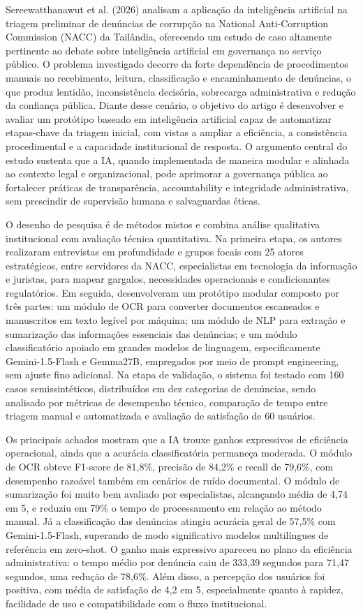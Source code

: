 \documentclass[12pt,a4paper]{article}
\begin{document}
Sereewatthanawut et al. (2026) analisam a aplicação da inteligência artificial na triagem preliminar de denúncias de corrupção na National Anti-Corruption Commission (NACC) da Tailândia, oferecendo um estudo de caso altamente pertinente ao debate sobre inteligência artificial em governança no serviço público. O problema investigado decorre da forte dependência de procedimentos manuais no recebimento, leitura, classificação e encaminhamento de denúncias, o que produz lentidão, inconsistência decisória, sobrecarga administrativa e redução da confiança pública. Diante desse cenário, o objetivo do artigo é desenvolver e avaliar um protótipo baseado em inteligência artificial capaz de automatizar etapas-chave da triagem inicial, com vistas a ampliar a eficiência, a consistência procedimental e a capacidade institucional de resposta. O argumento central do estudo sustenta que a IA, quando implementada de maneira modular e alinhada ao contexto legal e organizacional, pode aprimorar a governança pública ao fortalecer práticas de transparência, accountability e integridade administrativa, sem prescindir de supervisão humana e salvaguardas éticas.

O desenho de pesquisa é de métodos mistos e combina análise qualitativa institucional com avaliação técnica quantitativa. Na primeira etapa, os autores realizaram entrevistas em profundidade e grupos focais com 25 atores estratégicos, entre servidores da NACC, especialistas em tecnologia da informação e juristas, para mapear gargalos, necessidades operacionais e condicionantes regulatórios. Em seguida, desenvolveram um protótipo modular composto por três partes: um módulo de OCR para converter documentos escaneados e manuscritos em texto legível por máquina; um módulo de NLP para extração e sumarização das informações essenciais das denúncias; e um módulo classificatório apoiado em grandes modelos de linguagem, especificamente Gemini-1.5-Flash e Gemma27B, empregados por meio de prompt engineering, sem ajuste fino adicional. Na etapa de validação, o sistema foi testado com 160 casos semissintéticos, distribuídos em dez categorias de denúncias, sendo analisado por métricas de desempenho técnico, comparação de tempo entre triagem manual e automatizada e avaliação de satisfação de 60 usuários.

Os principais achados mostram que a IA trouxe ganhos expressivos de eficiência operacional, ainda que a acurácia classificatória permaneça moderada. O módulo de OCR obteve F1-score de 81,8\%, precisão de 84,2\% e recall de 79,6\%, com desempenho razoável também em cenários de ruído documental. O módulo de sumarização foi muito bem avaliado por especialistas, alcançando média de 4,74 em 5, e reduziu em 79\% o tempo de processamento em relação ao método manual. Já a classificação das denúncias atingiu acurácia geral de 57,5\% com Gemini-1.5-Flash, superando de modo significativo modelos multilíngues de referência em zero-shot. O ganho mais expressivo apareceu no plano da eficiência administrativa: o tempo médio por denúncia caiu de 333,39 segundos para 71,47 segundos, uma redução de 78,6\%. Além disso, a percepção dos usuários foi positiva, com média de satisfação de 4,2 em 5, especialmente quanto à rapidez, facilidade de uso e compatibilidade com o fluxo institucional.
\end{document}
